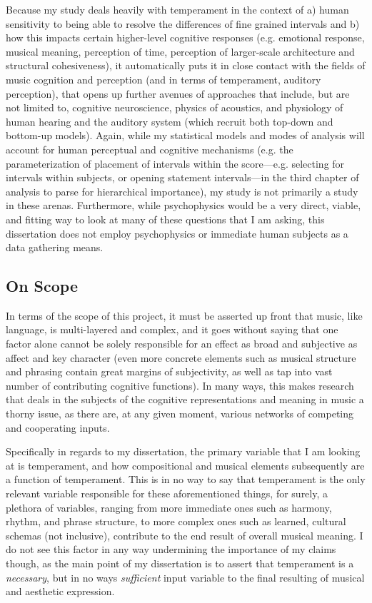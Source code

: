 Because my study deals heavily with temperament in the context of a)
human sensitivity to being able to resolve the differences of fine
grained intervals and b) how this impacts certain higher-level cognitive
responses (e.g. emotional response, musical meaning, perception of time,
perception of larger-scale architecture and structural cohesiveness), it
automatically puts it in close contact with the fields of music
cognition and perception (and in terms of temperament, auditory
perception), that opens up further avenues of approaches that include,
but are not limited to, cognitive neuroscience, physics of acoustics,
and physiology of human hearing and the auditory system (which recruit
both top-down and bottom-up models). Again, while my statistical models
and modes of analysis will account for human perceptual and cognitive
mechanisms (e.g. the parameterization of placement of intervals within
the score---e.g. selecting for intervals within subjects, or opening
statement intervals---in the third chapter of analysis to parse for
hierarchical importance), my study is not primarily a study in these
arenas. Furthermore, while psychophysics would be a very direct, viable,
and fitting way to look at many of these questions that I am asking,
this dissertation does not employ psychophysics or immediate human
subjects as a data gathering means.

\subsection{On Scope}\label{on-scope}

In terms of the scope of this project, it must be asserted up front that
music, like language, is multi-layered and complex, and it goes without
saying that one factor alone cannot be solely responsible for an effect
as broad and subjective as affect and key character (even more concrete
elements such as musical structure and phrasing contain great margins of
subjectivity, as well as tap into vast number of contributing cognitive
functions). In many ways, this makes research that deals in the subjects
of the cognitive representations and meaning in music a thorny issue, as
there are, at any given moment, various networks of competing and
cooperating inputs.

Specifically in regards to my dissertation, the primary variable that I
am looking at is temperament, and how compositional and musical elements
subsequently are a function of temperament. This is in no way to say
that temperament is the only relevant variable responsible for these
aforementioned things, for surely, a plethora of variables, ranging from
more immediate ones such as harmony, rhythm, and phrase structure, to
more complex ones such as learned, cultural schemas (not inclusive),
contribute to the end result of overall musical meaning. I do not see
this factor in any way undermining the importance of my claims though,
as the main point of my dissertation is to assert that temperament is a
\emph{necessary}, but in no ways \emph{sufficient} input variable to the
final resulting of musical and aesthetic expression.


    
    
    
